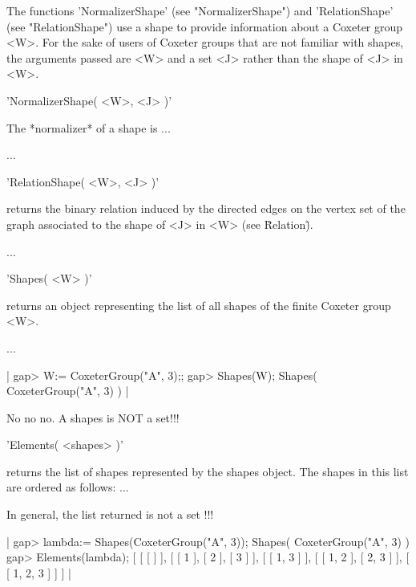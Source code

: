 
The    functions    'NormalizerShape'    (see   "NormalizerShape")    and
'RelationShape' (see "RelationShape") use  a shape to provide information
about a Coxeter group <W>.  For  the sake of users of Coxeter groups that
are not familiar with shapes, the  arguments passed are <W> and a set <J>
rather than the shape of <J> in <W>.



'NormalizerShape( <W>, <J> )'

The *normalizer* of a shape is ...

...


'RelationShape( <W>, <J> )'

returns the binary  relation induced by the directed  edges on the vertex
set of the graph associated to the shape of <J> in <W> (see \"Relation\").

...


'Shapes( <W> )'

returns  an object  representing the  list of  all shapes  of  the finite
Coxeter group <W>.

...

|    gap> W:= CoxeterGroup("A", 3);;
    gap> Shapes(W);
    Shapes( CoxeterGroup("A", 3) ) |


No no no.  A shapes is NOT a set!!!

'Elements( <shapes> )'

returns the list of shapes represented by the shapes object.  The shapes
in this list are ordered as follows: ...

In general, the list returned is not a set !!!

|    gap> lambda:= Shapes(CoxeterGroup("A", 3));
    Shapes( CoxeterGroup("A", 3) )
    gap> Elements(lambda);
    [ [ [  ] ], [ [ 1 ], [ 2 ], [ 3 ] ], [ [ 1, 3 ] ], 
      [ [ 1, 2 ], [ 2, 3 ] ], [ [ 1, 2, 3 ] ] ] |

